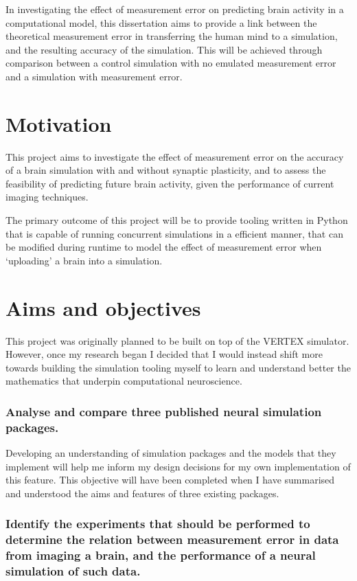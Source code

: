 In investigating the effect of measurement error on predicting brain activity in
a computational model, this dissertation aims to provide a link between the
theoretical measurement error in transferring the human mind to a simulation,
and the resulting accuracy of the simulation. This will be achieved through
comparison between a control simulation with no emulated measurement error and a
simulation with measurement error. 

\section{Motivation}

This project aims to investigate the effect of measurement error on the accuracy
of a brain simulation with and without synaptic plasticity, and to assess the
feasibility of predicting future brain activity, given the performance of
current imaging techniques.

The primary outcome of this project will be to provide tooling written in Python
that is capable of running concurrent simulations in a efficient manner, that can be modified during runtime to model the effect of measurement
error when `uploading' a brain into a simulation.

\section{Aims and objectives}

This project was originally planned to be built on top of the VERTEX simulator.
However, once my research began I decided that I would instead shift more
towards building the simulation tooling myself to learn and understand better
the mathematics that underpin computational neuroscience.

\subsubsection{Analyse and compare three published neural simulation packages.}

Developing an understanding of simulation packages and the models that they
implement will help me inform my design decisions for my own implementation of
this feature. This objective will have been completed when I have summarised and
understood the aims and features of three existing packages.


\subsubsection{Identify the experiments that should be performed to determine
      the relation between measurement error in data from imaging a brain, and the
      performance of a neural simulation of such data.}


